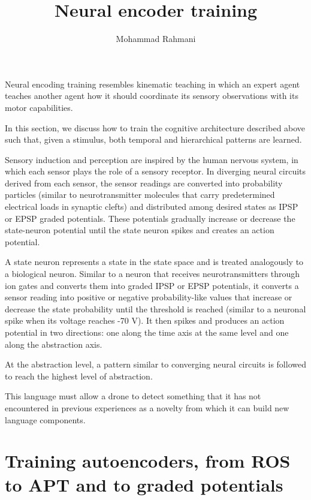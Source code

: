 \documentclass[a4paper]{article}
\title{Neural encoder training}
\date{}
\author{Mohammad Rahmani}
\begin{document}
   \maketitle

   \label{methodology_neural_encoder_tarining}


   Neural encoding training resembles kinematic teaching \cite{ablett-2025-multimodal-and-force-matched-imitation-learning-with-a-see-through-visuotactile-sensor} in which an expert agent teaches another agent how it should coordinate its sensory observations with its motor capabilities.

   In this section, we discuss how to train the cognitive architecture described above such that, given a stimulus, both temporal and hierarchical patterns are learned.

   Sensory induction and perception are inspired by the human nervous system, in which each sensor plays the role of a sensory receptor. In diverging neural circuits derived from each sensor, the sensor readings are converted into probability particles (similar to neurotransmitter molecules that carry predetermined electrical loads in synaptic clefts) and distributed among desired states as IPSP or EPSP graded potentials. These potentials gradually increase or decrease the state-neuron potential until the state neuron spikes and creates an action potential.

   A state neuron represents a state in the state space and is treated analogously to a biological neuron. Similar to a neuron that receives neurotransmitters through ion gates and converts them into graded IPSP or EPSP potentials, it converts a sensor reading into positive or negative probability-like values that increase or decrease the state probability until the threshold is reached (similar to a neuronal spike when its voltage reaches -70 V). It then spikes and produces an action potential in two directions: one along the time axis at the same level and one along the abstraction axis.

   At the abstraction level, a pattern similar to converging neural circuits is followed to reach the highest level of abstraction.

   This language must allow a drone to detect something that it has not encountered in previous experiences as a novelty from which it can build new language components.

   \section{Training autoencoders, from ROS to APT and to graded potentials}
\end{document}
